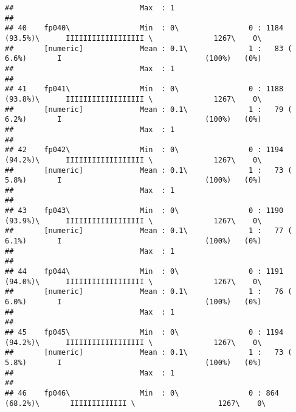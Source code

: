 \documentclass[]{article}
\begin{document}
\begin{verbatim}
##                             Max  : 1                                                                                            
## 
## 40    fp040\                Min  : 0\                0 : 1184 (93.5%)\      IIIIIIIIIIIIIIIIII \              1267\    0\       
##       [numeric]             Mean : 0.1\              1 :   83 ( 6.6%)       I                                 (100%)   (0%)     
##                             Max  : 1                                                                                            
## 
## 41    fp041\                Min  : 0\                0 : 1188 (93.8%)\      IIIIIIIIIIIIIIIIII \              1267\    0\       
##       [numeric]             Mean : 0.1\              1 :   79 ( 6.2%)       I                                 (100%)   (0%)     
##                             Max  : 1                                                                                            
## 
## 42    fp042\                Min  : 0\                0 : 1194 (94.2%)\      IIIIIIIIIIIIIIIIII \              1267\    0\       
##       [numeric]             Mean : 0.1\              1 :   73 ( 5.8%)       I                                 (100%)   (0%)     
##                             Max  : 1                                                                                            
## 
## 43    fp043\                Min  : 0\                0 : 1190 (93.9%)\      IIIIIIIIIIIIIIIIII \              1267\    0\       
##       [numeric]             Mean : 0.1\              1 :   77 ( 6.1%)       I                                 (100%)   (0%)     
##                             Max  : 1                                                                                            
## 
## 44    fp044\                Min  : 0\                0 : 1191 (94.0%)\      IIIIIIIIIIIIIIIIII \              1267\    0\       
##       [numeric]             Mean : 0.1\              1 :   76 ( 6.0%)       I                                 (100%)   (0%)     
##                             Max  : 1                                                                                            
## 
## 45    fp045\                Min  : 0\                0 : 1194 (94.2%)\      IIIIIIIIIIIIIIIIII \              1267\    0\       
##       [numeric]             Mean : 0.1\              1 :   73 ( 5.8%)       I                                 (100%)   (0%)     
##                             Max  : 1                                                                                            
## 
## 46    fp046\                Min  : 0\                0 : 864 (68.2%)\       IIIIIIIIIIIII \                   1267\    0\       

\end{verbatim}
\end{document}
